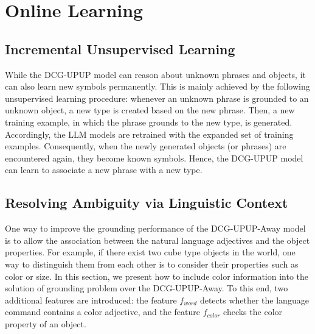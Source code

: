 \section{Online Learning}
\label{sec:implementation}
\subsection{Incremental Unsupervised Learning}
While the DCG-UPUP model can reason about unknown phrases and objects, it can also learn new symbols permanently. This is mainly achieved by the following unsupervised learning procedure: whenever an unknown phrase is grounded to an unknown object, a new type is created based on the new phrase. Then, a new training example, in which the phrase grounds to the new
type, is generated. Accordingly, the LLM models are retrained with the expanded set of training examples. Consequently, when the newly generated objects (or phrases) are encountered again, they become known symbols. Hence, the DCG-UPUP model can learn to associate a new phrase with a new type.


\subsection{Resolving Ambiguity via Linguistic Context}
\label{sec:color}
One way to improve the grounding performance of the DCG-UPUP-Away model is to allow the association between the natural language adjectives and the object properties. For example, if there exist two cube type objects in the world, one way to distinguish them from each other is to consider their properties such as color or size. In this section, we present how to include color information into the solution of grounding problem over the DCG-UPUP-Away. To this end, two additional features are introduced: the feature $f_{word}$ detects whether the language command contains a color adjective, and the feature $f_{color}$ checks the color property of an object.     

